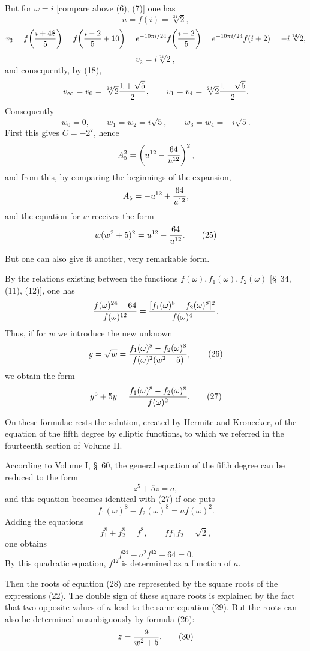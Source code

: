 \documentclass[11pt]{article}
\begin{document}
But for \(\omega=i\) [compare above (6), (7)] one has
\[
 u=f(i)=\sqrt[24]{2},
\]
\[
 v_3=f\!\left({i+48\over5}\right)
 =f\!\left({i-2\over5}+10\right)
 =e^{-10\pi i/24}f\!\left({i-2\over5}\right)
 =e^{-10\pi i/24}f(i+2)=-i\sqrt[24]{2},
\]
\[
 v_2=i\sqrt[24]{2},
\]
and consequently, by (18),
\[
 v_\infty=v_0=\sqrt[24]{2}{1+\sqrt5\over2},\qquad
 v_1=v_4=\sqrt[24]{2}{1-\sqrt5\over2}.
\]
Consequently
\[
 w_0=0,\qquad w_1=w_2=i\sqrt5,\qquad w_3=w_4=-i\sqrt5.
\]
First this gives \(C=-2^7\), hence
\[
 A_5^2=\left(u^{12}-{64\over u^{12}}\right)^2,
\]
and from this, by comparing the beginnings of the expansion,
\[
 A_5=-u^{12}+{64\over u^{12}},
\]
and the equation for \(w\) receives the form
\begin{equation}
 w(w^2+5)^2=u^{12}-{64\over u^{12}}.
\tag{25}
\end{equation}

But one can also give it another, very remarkable form.

By the relations existing between the functions \(f(\omega),f_1(\omega),f_2(\omega)\) [\S~34, (11), (12)], one has
\[
 {f(\omega)^{24}-64\over f(\omega)^{12}}
 ={[f_1(\omega)^8-f_2(\omega)^8]^2\over f(\omega)^4}.
\]
Thus, if for \(w\) we introduce the new unknown
\begin{equation}
 y=\sqrt w={f_1(\omega)^8-f_2(\omega)^8\over f(\omega)^2(w^2+5)},
\tag{26}
\end{equation}
we obtain the form
\begin{equation}
 y^5+5y={f_1(\omega)^8-f_2(\omega)^8\over f(\omega)^2}.
\tag{27}
\end{equation}

On these formulae rests the solution, created by Hermite and Kronecker, of the equation of the fifth degree by elliptic functions, to which we referred in the fourteenth section of Volume II.

According to Volume I, \S~60, the general equation of the fifth degree can be reduced to the form
\begin{equation}
 z^5+5z=a,
\tag{28}
\end{equation}
and this equation becomes identical with (27) if one puts
\[
 f_1(\omega)^8-f_2(\omega)^8=af(\omega)^2.
\]
Adding the equations
\[
 f_1^8+f_2^8=f^8,\qquad ff_1f_2=\sqrt2,
\]
one obtains
\begin{equation}
 f^{24}-a^2f^{12}-64=0.
\tag{29}
\end{equation}
By this quadratic equation, \(f^{12}\) is determined as a function of \(a\).

Then the roots of equation (28) are represented by the square roots of the expressions (22). The double sign of these square roots is explained by the fact that two opposite values of \(a\) lead to the same equation (29). But the roots can also be determined unambiguously by formula (26):
\begin{equation}
 z={a\over w^2+5}.
\tag{30}
\end{equation}
\end{document}
